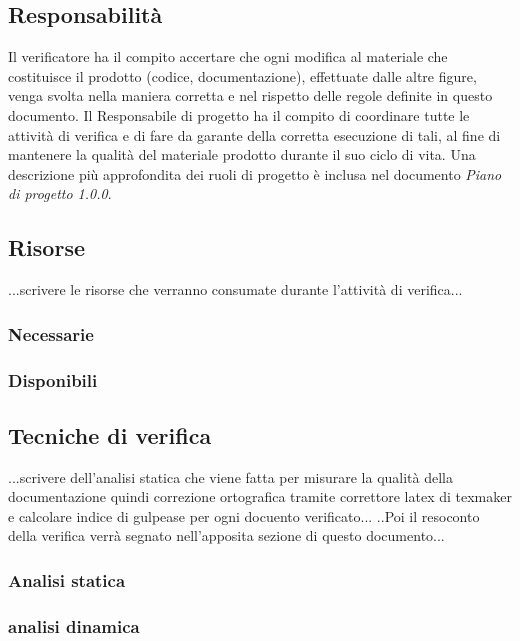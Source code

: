 \subsection{Responsabilità}
Il verificatore ha il compito accertare che ogni modifica al materiale che costituisce il prodotto (codice, documentazione), effettuate dalle altre figure, venga svolta nella maniera corretta e nel rispetto delle regole definite in questo documento. Il Responsabile di progetto ha il compito di coordinare tutte le attività di verifica e di fare da garante della corretta esecuzione di tali, al fine di mantenere la qualità del materiale prodotto durante il suo ciclo di vita. Una descrizione più approfondita dei ruoli di progetto è inclusa nel documento  \textit{Piano di progetto 1.0.0}.



\subsection{Risorse}
...scrivere le risorse che verranno consumate durante l'attività di verifica...
\subsubsection{Necessarie}
\subsubsection{Disponibili}
\subsection{Tecniche di verifica}
...scrivere dell'analisi statica che viene fatta per misurare la qualità della documentazione quindi correzione ortografica tramite correttore latex di texmaker e calcolare indice di gulpease per ogni docuento verificato...
..Poi il resoconto della verifica verrà segnato nell'apposita sezione di questo documento...
\subsubsection{Analisi statica}
\subsubsection{analisi dinamica}